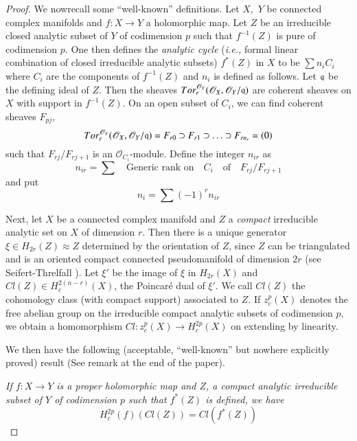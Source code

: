 \begin{proof}
We now\pageoriginale  recall some ``well-known'' definitions. Let $X,$ $Y$ be connected complex manifolds and $f: X \to Y$ a holomorphic map. Let $Z$ be an irreducible closed analytic subset of $Y$ of codimension $p$ such that $f^{-1}(Z)$ is pure of codimension $p$. One then defines the {\em analytic cycle} ({\em i.e.,} formal linear combination of closed irreducible analytic subsets) $f^*(Z)$ in $X$ to be $\sum n_i C_i$ where $C_i$ are the components of $f^{-1} (Z)$ and $n_i$ is defined as follows. Let $\mathfrak{q}$ be the defining ideal of $Z$. Then the sheaves $Tor_r^{\mathscr{O}_Y} (\mathscr{O}_X, \mathscr{O}_Y/ \mathfrak{q})$ are coherent sheaves on $X$ with support in $f^{-1} (Z)$. On an open subset of $C_i$, we can find coherent sheaves $F_{pj}$,
$$
Tor_r^{\mathscr{O}_Y} (\mathscr{O}_X, \mathscr{O}_Y/\mathfrak{q}) = F_{r0} \supset F_{r1} \supset \ldots \supset F_{rn_r} = (0)
$$
such that $F_{rj}/F_{rj+1}$ is an $\mathscr{O}_{C_i}$-module. Define the integer $n_{ir}$ as 
$$
n_{ir} = \sum \text{ ~~Generic rank on~~ } C_i  \text{ ~~of~~ } F_{rj}/F_{rj+1}
$$
and put 
$$
n_i = \sum (-1)^r n_{ir}
$$

Next, let $X$ be a connected complex manifold and $Z$ a {\em compact} irreducible analytic set on $X$ of dimension $r$. Then there is a unique generator $\xi \in H_{2r} (Z) \approx Z$ determined by the orientation of $Z$, since $Z$ can be triangulated and is an oriented compact connected pseudomanifold of dimension $2r$ (see Seifert-Threlfall \cite{art7-key3}). Let $\xi'$  be the image of $\xi$ in $H_{2r} (X)$ and $Cl (Z) \in H^{2(n-r)}_c (X)$, the Poincar\'e dual of $\xi'$. We call $Cl(Z)$ the cohomology class (with compact support) associated to $Z$. If $z^p_c(X)$ denotes the free abelian group on the irreducible compact analytic subsets of codimension $p$, we obtain a homomorphism $Cl: z^{p}_c(X) \to H^{2p}_c(X)$ on extending by linearity.

We then have the following (acceptable, ``well-known'' but nowhere explicitly proved) result (See remark at the end of the paper).

{\em If $f: X \to Y$ is a proper holomorphic map and $Z$, a compact analytic irreducible subset of $Y$ of codimension $p$ such that $f^*(Z)$ is defined, we have}
$$
H^{2p}_c (f) (Cl(Z)) = Cl (f^* (Z))
$$


\end{proof}

